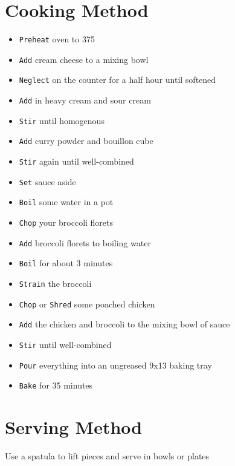\documentclass{article}
\let\US\SI
\begin{document}
\begin{multicols}{2}
\section{Cooking Method}
\begin{itemize}
	\item \verb|Preheat| oven to \US{375}{\fahrenheit}	
	\item \verb|Add| cream cheese to a mixing bowl
	\item \verb|Neglect| on the counter for a half hour until softened
	\item \verb|Add| in heavy cream and sour cream
	\item \verb|Stir| until homogenous
	\item \verb|Add| curry powder\cite{CURRYPOWDER} and bouillon cube
	\item \verb|Stir| again until well-combined
	\item \verb|Set| sauce aside
	\item \verb|Boil| some water in a pot
	\item \verb|Chop| your broccoli florets
	\item \verb|Add| broccoli florets to boiling water
	\item \verb|Boil| for about 3 minutes
	\item \verb|Strain| the broccoli
	\item \verb|Chop| or \verb|Shred| some poached chicken\cite{CHICKEN}
	\item \verb|Add| the chicken and broccoli to the mixing bowl of sauce
	\item \verb|Stir| until well-combined
	\item \verb|Pour| everything into an ungreased 9x13 baking tray
	\item \verb|Bake| for 35 minutes
\end{itemize}

\section{Serving Method}
Use a spatula to lift pieces and serve in bowls or plates



\end{multicols}
\end{document}
